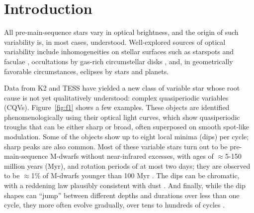 \documentclass[11pt,twocolumn,tighten]{aastex63}
\begin{document}


\section{Introduction}
\label{sec:intro}


All pre-main-sequence stars vary in optical brightness, and the origin
of such variability is, in most cases, understood.  Well-explored
sources of optical variability include inhomogeneities on stellar
surfaces such as starspots and faculae \citep{2021isma.book.....B},
occultations by gas-rich circumstellar disks
\citep{2017MNRAS.470..202B}, and, in geometrically favorable
circumstances, eclipses by stars and planets.

Data from K2 and TESS have yielded a new class of variable star whose
root cause is not yet qualitatively understood: complex quasiperiodic
variables (CQVs).  Figure~\ref{fig:f1} shows a few examples.  These
objects are identified phenomenologically using their optical light
curves, which show quasiperiodic troughs that can be either sharp or
broad, often superposed on smooth spot-like modulation.  Some of the
objects show up to eight local minima (dips) per cycle; sharp peaks
are also common.  Most of these variable stars turn out to be
pre-main-sequence M-dwarfs without near-infrared excesses, with ages
of $\approx$5-150 million years (Myr), and rotation periods of at most
two days; they are observed to be $\approx$1\% of M-dwarfs younger
than 100 Myr
\citep{2016AJ....152..114R,2017AJ....153..152S,2018AJ....155...63S,2019ApJ...876..127Z,2022AJ....163..144G}.
The dips can be chromatic, with a reddening law plausibly consistent
with dust
\citep{2020AJ....160...86B,2022AJ....163..144G,2023MNRAS.518.2921K}.
And finally, while the dip shapes can ``jump'' between different
depths and durations over less than one cycle, they more often evolve
gradually, over tens to hundreds of cycles
\citep[e.g.][]{2017AJ....153..152S,2022ApJ...925...75P,2023ApJ...945..114P}.
\end{document}

